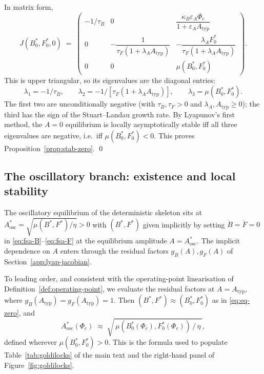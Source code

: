 In matrix form,
\begin{equation}
  J(B^*_0,F^*_0,0) \;=\;
    \begin{pmatrix}
      -1/\tau_B & 0 & \dfrac{\kappa_B \varepsilon_A \Phi_c}{1+\varepsilon_A A_{\mathrm{typ}}} \\[6pt]
      0 & -\dfrac{1}{\tau_F(1+\lambda_A A_{\mathrm{typ}})}
        & -\dfrac{\lambda_A F^*_0}{\tau_F(1+\lambda_A A_{\mathrm{typ}})} \\[6pt]
      0 & 0 & \mu(B^*_0,F^*_0)
    \end{pmatrix}.
  \label{eq:jacobian}
\end{equation}
This is upper triangular, so its eigenvalues are the diagonal
entries:
\begin{equation}
  \lambda_1 = -1/\tau_B,
  \qquad
  \lambda_2 = -1/[\tau_F(1+\lambda_A A_{\mathrm{typ}})],
  \qquad
  \lambda_3 = \mu(B^*_0,F^*_0).
  \label{eq:eigs}
\end{equation}
The first two are unconditionally negative (with $\tau_B,\tau_F > 0$
and $\lambda_A,A_{\mathrm{typ}} \ge 0$); the third has the sign of
the Stuart--Landau growth rate. By Lyapunov's first method, the
$A=0$ equilibrium is locally asymptotically stable iff all three
eigenvalues are negative, i.e.\ iff $\mu(B^*_0,F^*_0) < 0$. This
proves Proposition~\ref{prop:stab-zero}. \qed

\subsection{The oscillatory branch: existence and local stability}\label{app:lyap-osc}

The oscillatory equilibrium of the deterministic skeleton sits at
$A^*_{\mathrm{osc}} = \sqrt{\mu(B^*,F^*)/\eta} > 0$ with
$(B^*,F^*)$ given implicitly by setting
$\dot B = \dot F = 0$ in
\eqref{eq:fsa-B}--\eqref{eq:fsa-F} at the equilibrium amplitude
$A = A^*_{\mathrm{osc}}$. The implicit dependence on $A$ enters
through the residual factors $g_B(A),g_F(A)$ of
Section~\ref{app:lyap-jacobian}.

To leading order, and consistent with the
operating-point linearisation of Definition~\ref{def:operating-point},
we evaluate the residual factors at $A = A_{\mathrm{typ}}$, where
$g_B(A_{\mathrm{typ}}) = g_F(A_{\mathrm{typ}}) = 1$. Then
$(B^*,F^*) \approx (B^*_0,F^*_0)$ as in \eqref{eq:eq-zero}, and
\begin{equation}
  A^*_{\mathrm{osc}}(\Phi_c)
   \;\approx\; \sqrt{\,\mu(B^*_0(\Phi_c),F^*_0(\Phi_c))\,/\,\eta\,},
  \label{eq:A-osc-approx}
\end{equation}
defined wherever $\mu(B^*_0,F^*_0) > 0$. This is the formula used
to populate Table~\ref{tab:goldilocks} of the main text and the
right-hand panel of Figure~\ref{fig:goldilocks}.

